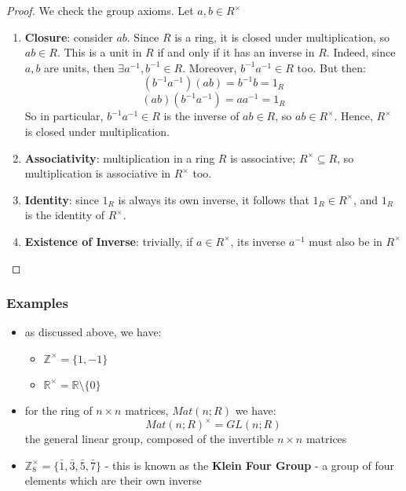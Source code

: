 \documentclass{exam}
\begin{document}

\begin{proof}

We check the group axioms. Let $a,b \in R^{\times}$

\begin{enumerate}
    \item \textbf{Closure}: consider $ab$. Since $R$ is a ring, it is closed under multiplication, so $ab \in R$. This is a unit in $R$ if and only if it has an inverse in $R$. Indeed, since $a,b$ are units, then $\exists a^{-1}, b^{-1} \in R$. Moreover, $b^{-1}a^{-1} \in R$ too. But then:
    \[
    (b^{-1}a^{-1})(ab) = b^{-1}b = 1_R
    \]
     \[
    (ab)(b^{-1}a^{-1}) = aa^{-1} = 1_R
    \]
    So in particular, $b^{-1}a^{-1} \in R$ is the inverse of $ab \in R$, so $ab \in R^{\times}$. Hence, $R^{\times }$ is closed under multiplication.
    \item \textbf{Associativity}: multiplication in a ring $R$ is associative; $R^{\times} \subseteq R$, so multiplication is associative in $R^{\times}$ too.
    \item \textbf{Identity}: since $1_R$ is always its own inverse, it follows that $1_R \in R^{\times}$, and $1_R$ is the identity of $R^\times$.
    \item \textbf{Existence of Inverse}: trivially, if $a \in R^\times$, its inverse $a^{-1}$ must also be in $R^\times$
\end{enumerate}

\end{proof}

\subsubsection{Examples}

\begin{itemize}
    \item as discussed above, we have:
    \begin{itemize}
        \item $\mathbb{Z}^\times = \{1,-1\}$
        \item $\mathbb{R}^\times = \mathbb{R}\setminus \{0\}$
    \end{itemize}
    \item for the ring of $n \times n$ matrices, $Mat(n; R)$ we have:
    \[
    Mat(n;R)^\times = GL(n;R)
    \]
    the general linear group, composed of the invertible $n \times n$ matrices
    \item $\mathbb{Z}_8^\times = \{\bar{1}, \bar{3}, \bar{5}, \bar{7}\}$ - this is known as the \textbf{Klein Four Group} - a group of four elements which are their own inverse
\end{itemize}
\end{document}
